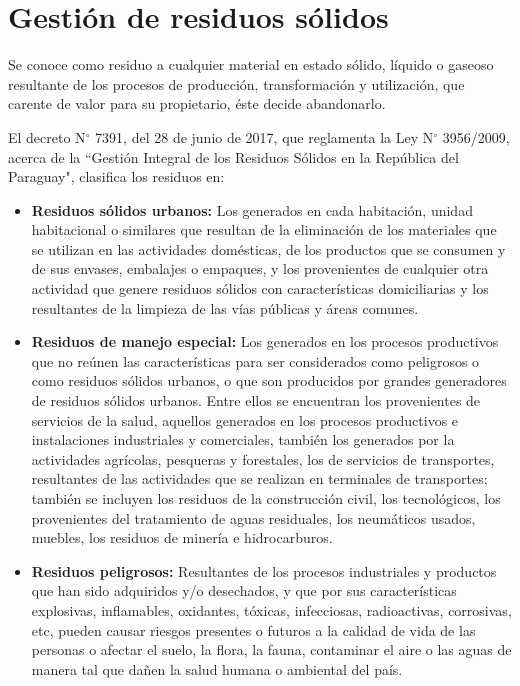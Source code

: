\chapter{Gestión de residuos sólidos}
\label{chap2}
\ifpdf
  \graphicspath{{Chapter2/Chapter2Figs/}}
\else
  \graphicspath{{Chapter2/Chapter2Figs/}}\fi


Se conoce como residuo a cualquier material en estado sólido, líquido o gaseoso resultante de los procesos de producción, transformación y utilización, que carente de valor para su propietario, éste decide abandonarlo.

El decreto N$^{\circ}$ 7391, del 28 de junio de 2017, que reglamenta la Ley N$^{\circ}$ 3956/2009, acerca de la ``Gestión Integral de los Residuos Sólidos en la República del Paraguay", clasifica los residuos en:

\begin{itemize}
\item \textbf{Residuos sólidos urbanos:} Los generados en cada habitación, unidad habitacional o similares que resultan de la eliminación de los materiales que se utilizan en las actividades domésticas, de los productos que se consumen y de sus envases, embalajes o empaques, y los provenientes de cualquier otra actividad que genere residuos sólidos con características domiciliarias y los resultantes de la limpieza de las vías públicas y áreas comunes.
\item \textbf{Residuos de manejo especial:} Los generados en los procesos productivos que no reúnen las características para ser considerados como peligrosos o como residuos sólidos urbanos, o que son producidos por grandes generadores de residuos sólidos urbanos. Entre ellos se encuentran los provenientes de servicios de la salud, aquellos generados en los procesos productivos e instalaciones industriales y comerciales, también los generados por la actividades agrícolas, pesqueras y forestales, los de servicios de transportes, resultantes de las actividades que se realizan en terminales de transportes; también se incluyen los residuos de la construcción civil, los tecnológicos, los provenientes del tratamiento de aguas residuales, los neumáticos usados, muebles, los residuos de minería e hidrocarburos.
\item \textbf{Residuos peligrosos:} Resultantes de los procesos industriales y productos que han sido adquiridos y/o desechados, y que por sus características explosivas, inflamables, oxidantes, tóxicas, infecciosas, radioactivas, corrosivas, etc, pueden causar riesgos presentes o futuros a la calidad de vida de las personas o afectar el suelo, la flora, la fauna, contaminar el aire o las aguas de manera tal que dañen la salud humana o ambiental del país.
\end{itemize}

